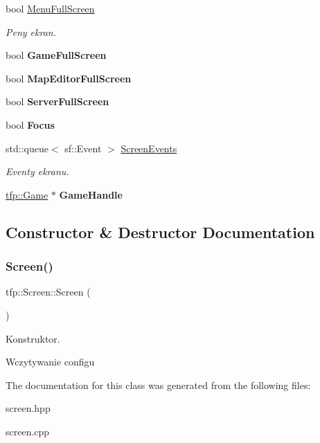 \begin{DoxyCompactItemize}
bool \mbox{\hyperlink{classtfp_1_1_screen_af3ceb9db1a09942ef0e05817ec488a0c}{Menu\+Full\+Screen}}
\begin{DoxyCompactList}\small\item\em Peny ekran. \end{DoxyCompactList}\item 
\mbox{\label{classtfp_1_1_screen_a956bcb4c85e3296ce5a2946f18a50c14}} 
bool {\bfseries Game\+Full\+Screen}
\item 
\mbox{\label{classtfp_1_1_screen_a0207594653fdf2fdbf61cbfc7b8824fd}} 
bool {\bfseries Map\+Editor\+Full\+Screen}
\item 
\mbox{\label{classtfp_1_1_screen_ad7acd08a074f4ff2e8f920efd417c534}} 
bool {\bfseries Server\+Full\+Screen}
\item 
\mbox{\label{classtfp_1_1_screen_af31c6bbfdc16f6edfb70f6fdf27dd49b}} 
bool {\bfseries Focus}
\item 
\mbox{\label{classtfp_1_1_screen_a4abf6964cedb2d2ad0fdcbbc40335f2d}} 
std\+::queue$<$ sf\+::\+Event $>$ \mbox{\hyperlink{classtfp_1_1_screen_a4abf6964cedb2d2ad0fdcbbc40335f2d}{Screen\+Events}}
\begin{DoxyCompactList}\small\item\em Eventy ekranu. \end{DoxyCompactList}\item 
\mbox{\label{classtfp_1_1_screen_ac6fd9e943c0c10ec0ad6de58874bac04}} 
\mbox{\hyperlink{classtfp_1_1_game}{tfp\+::\+Game}} $\ast$ {\bfseries Game\+Handle}
\end{DoxyCompactItemize}


\subsection{Constructor \& Destructor Documentation}
\mbox{\label{classtfp_1_1_screen_a8a5d28db3e41c9e816dc1ea6a6aa9a81}} 
\subsubsection{\texorpdfstring{Screen()}{Screen()}}
{\footnotesize\ttfamily tfp\+::\+Screen\+::\+Screen (\begin{DoxyParamCaption}{ }\end{DoxyParamCaption})}



Konstruktor. 

Wczytywanie configu 

The documentation for this class was generated from the following files\+:\begin{DoxyCompactItemize}
\item 
screen.\+hpp\item 
screen.\+cpp\end{DoxyCompactItemize}
